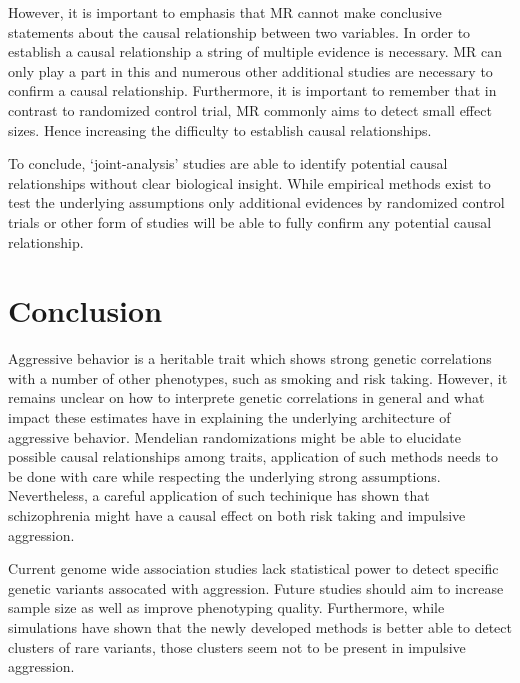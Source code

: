 However, it is important to emphasis that MR cannot make conclusive statements about the causal relationship between two variables.
In order to establish a causal relationship a string of multiple evidence is necessary.
MR can only play a part in this and numerous other additional studies are necessary to confirm a causal relationship.
Furthermore, it is important to remember that in contrast to randomized control trial, MR commonly aims to detect small effect sizes.
Hence increasing the difficulty to establish causal relationships. 

To conclude, `joint-analysis' studies are able to identify potential causal relationships without clear biological insight.
While empirical methods exist to test the underlying assumptions only additional evidences by randomized control trials or other form of studies will be able to fully confirm any potential causal relationship.

\section{Conclusion}
\label{sec:conclusion}

Aggressive behavior is a heritable trait which shows strong genetic correlations with a number of other phenotypes, such as smoking and risk taking.
However, it remains unclear on how to interprete genetic correlations in general and what impact these estimates have in explaining the underlying architecture of aggressive behavior.
Mendelian randomizations might be able to elucidate possible causal relationships among traits, application of such methods needs to be done with care while respecting the underlying strong assumptions. 
Nevertheless, a careful application of such techinique has shown that schizophrenia might have a causal effect on both risk taking and impulsive aggression.

Current genome wide association studies lack statistical power to detect specific genetic variants assocated with aggression.
Future studies should aim to increase sample size as well as improve phenotyping quality.
Furthermore, while simulations have shown that the newly developed methods is better able to detect clusters of rare variants, those clusters seem not to be present in impulsive aggression.
